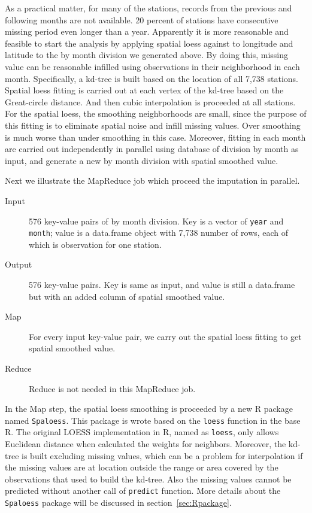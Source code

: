 As a practical matter, for many of the stations, records from the previous and
following months are not available. 20 percent of stations have consecutive 
missing period even longer than a year. Apparently it is more reasonable and
feasible to start the analysis by applying spatial loess against to longitude and 
latitude to the by month division we generated above. By doing this, missing 
value can be reasonable infilled using observations in their neighborhood in each 
month. Specifically, a kd-tree \cite{bentley1980multidimensional} is built based 
on the location of all 7,738 stations. Spatial loess fitting is carried out at
each vertex of the kd-tree based on the Great-circle distance. And then cubic 
interpolation is proceeded at all stations. For the spatial loess, the smoothing
neighborhoods are small, since the purpose of this fitting is to eliminate 
spatial noise and infill missing values. Over smoothing is much worse than 
under smoothing in this case.   
Moreover, fitting in each month are carried out independently in parallel using 
database of division by month as input, and generate a new by month division with 
spatial smoothed value.

Next we illustrate the MapReduce job which proceed the imputation in parallel.
\begin{description}
  \item[Input] 576 key-value pairs of by month division. Key is a vector of
  \texttt{year} and \texttt{month}; value is a data.frame object with 7,738 
  number of rows, each of which is observation for one station.
  \item[Output] 576 key-value pairs. Key is same as input, and value is still
  a data.frame but with an added column of spatial smoothed value. 
  \item[Map]For every input key-value pair, we carry out the spatial loess 
  fitting to get spatial smoothed value. 
  \item[Reduce] Reduce is not needed in this MapReduce job.
\end{description}

In the Map step, the spatial loess smoothing is proceeded by a new R package 
named \texttt{Spaloess}. This package is wrote based on the \texttt{loess} function
in the base R. The original LOESS implementation in R, named as \texttt{loess},
only allows Euclidean distance when calculated the weights for neighbors. Moreover,
the kd-tree is built excluding missing values, which can be a problem for 
interpolation if the missing values are at location outside the range or area 
covered by the observations that used to build the kd-tree. Also the missing
values cannot be predicted without another call of \texttt{predict} function. 
More details about the \texttt{Spaloess} package will be discussed in 
section~\ref{sec:Rpackage}.

